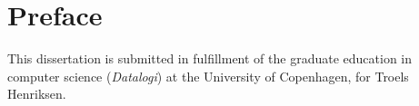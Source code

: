 {}
\chapter*{Preface}
This dissertation is submitted in fulfillment of the graduate education
in computer science (\textit{Datalogi}) at the University of
Copenhagen, for Troels Henriksen.